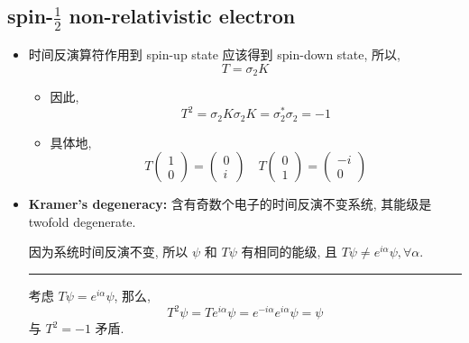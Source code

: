 \subsection{spin-\texorpdfstring{$\frac{1}{2}$}{1/2} non-relativistic electron}
\begin{itemize}
	\item 时间反演算符作用到 spin-up state 应该得到 spin-down state, 所以,
	\begin{equation}
		T = \sigma_2 K
	\end{equation}
	\begin{itemize}
		\item 因此,
		\begin{equation}
			T^2 = \sigma_2 K \sigma_2 K = \sigma_2^* \sigma_2 = - 1
		\end{equation}
		
		\item 具体地,
		\begin{equation}
			T \begin{pmatrix}
				1 \\
				0
			\end{pmatrix} = \begin{pmatrix}
				0 \\
				i
			\end{pmatrix} \quad T \begin{pmatrix}
				0 \\
				1
			\end{pmatrix} = \begin{pmatrix}
				- i \\
				0
			\end{pmatrix}
		\end{equation}
	\end{itemize}
	
	\item \textbf{Kramer's degeneracy:} 含有奇数个电子的时间反演不变系统, 其能级是 twofold degenerate.
	
	\begin{tcolorbox}[title=proof:]
		因为系统时间反演不变, 所以 $\psi$ 和 $T \psi$ 有相同的能级, 且 $T \psi \neq e^{i \alpha} \psi, \forall \alpha$.
		
		\noindent\rule[0.5ex]{\linewidth}{0.5pt} %
		
		考虑 $T \psi = e^{i \alpha} \psi$, 那么,
		\begin{equation}
			T^2 \psi = T e^{i \alpha} \psi = e^{- i \alpha} e^{i \alpha} \psi = \psi
		\end{equation}
		与 $T^2 = - 1$ 矛盾.
	\end{tcolorbox}
\end{itemize}
